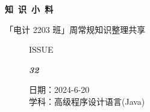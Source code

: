 \documentclass[UTF8]{ctexart}
\newcommand\Black[1]{\textcolor[gray]{0.3}{#1}}
\newcommand\Brown[1]{\textcolor[HTML]{998A4E}{#1}}
\newcommand\IssueNumber{32}
\newcommand\Date{2024-6-20}
\newcommand\Subject{高级程序设计语言(Java)}
\begin{document}
\BgThispage
\begin{center}
\phantom{...}

{\Large\textcolor{brown!40!white}{}}

\vspace{-2em}

{\Huge\bfseries\TitleFont \Black{知\ 识\ 小\ 料}}


\vspace{-0.1cm}
{\footnotesize \Brown{「电计 2203 班」周常规知识整理共享}}
\end{center}

\vspace{-0.5cm}


\begin{figure}[H]
\hspace{1cm}
\begin{minipage}[t]{0.3\textwidth}
\centering
    \Brown{\Genshin ISSUE}

    \vspace{-0.6cm}
    \Huge \Issue\slshape\bfseries\Black{\IssueNumber}
\end{minipage}
\hfill
\begin{minipage}[t]{0.35\textwidth}
\centering
    \Brown{日期：\Date} \\
\vspace{-0.1cm}
    \Brown{学科：\Subject} \\
\end{minipage}
\hspace{0.8cm}
\end{figure}
\end{document}
